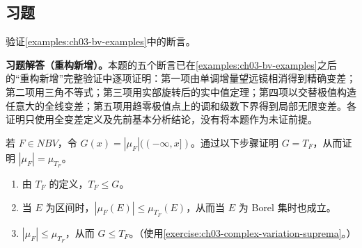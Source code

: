 \documentclass[../../main.tex]{subfiles}%
\begin{document}
\subsection*{习题}
\begin{exercise}\label{exercise:ch03-bv-examples-proof}
验证\cref{examples:ch03-bv-examples}中的断言。
\end{exercise}
\begin{solution}
\label{solution:ch03-bv-examples-proof}
\textbf{习题解答（重构新增）。}本题的五个断言已在\cref{examples:ch03-bv-examples}之后的“重构新增”完整验证中逐项证明：第一项由单调增量望远镜相消得到精确变差；第二项用三角不等式；第三项用实部旋转后的实中值定理；第四项以交替极值构造任意大的全线变差；第五项用趋零极值点上的调和级数下界得到局部无限变差。各证明只使用全变差定义及先前基本分析结论，没有将本题作为未证前提。
\end{solution}
\begin{exercise}\label{exercise:ch03-variation-measure-equality}
若 $F\in NBV$，令 $G(x)=|\mu_F|((-\infty,x])$。通过以下步骤证明 $G=T_F$，从而证明 $|\mu_F|=\mu_{T_F}$。
\begin{enumerate}
\item\label{item:ch03-variation-first-bound} 由 $T_F$ 的定义，$T_F\le G$。
\item\label{item:ch03-variation-interval-bound} 当 $E$ 为区间时，$|\mu_F(E)|\le\mu_{T_F}(E)$，从而当 $E$ 为 Borel 集时也成立。
\item\label{item:ch03-variation-second-bound} $|\mu_F|\le\mu_{T_F}$，从而 $G\le T_F$。（使用\cref{exercise:ch03-complex-variation-suprema}。）
\end{enumerate}
\end{exercise}
\end{document}
